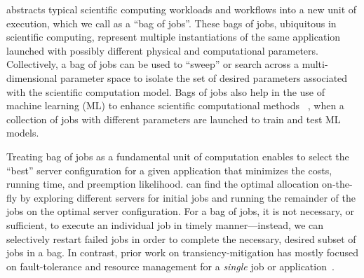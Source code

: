 




\sysname abstracts typical scientific computing workloads and workflows into a new unit of execution, which we call as a ``bag of jobs''. 
These bags of jobs, ubiquitous in scientific computing, represent multiple instantiations of the same application launched with possibly different physical and computational parameters. 
Collectively, a bag of jobs can be used to ``sweep'' or search across a multi-dimensional parameter space to isolate the set of desired parameters associated with the scientific computation model. 
Bags of jobs also help in the use of machine learning (ML) to enhance scientific computational methods ~\cite{ml.atomic2017,melko2017,sam2017,fu2017,long2015machine, ferguson2017machine,ward2018matminer}, when a collection of jobs with different  parameters  are launched to train and test ML models.



%
Treating bag of jobs as a fundamental unit of computation enables \sysname to select the ``best'' server configuration for a given application that minimizes the costs, running time, and preemption likelihood.
\sysname can find the optimal allocation on-the-fly by exploring different servers for initial jobs and running the remainder of the jobs on the optimal server configuration. 
%
For a bag of jobs, it is not necessary, or sufficient, to execute an individual job in timely manner---instead, we can selectively restart failed jobs in order to complete the necessary, desired subset of jobs in a bag.
In contrast, prior work on transiency-mitigation has mostly focused on fault-tolerance and resource management for a \emph{single} job or application~\cite{spoton, exosphere, flint, marathe2014exploiting}. 

